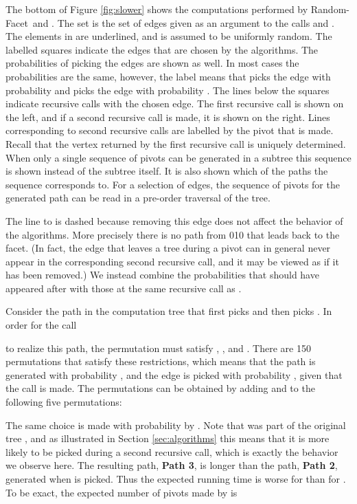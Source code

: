 \documentclass[twoside,11pt]{article}
\newcommand{\RandomFacet}{\mbox{\sc Random-}\allowbreak\mbox{\sc Facet}}
\begin{document}
The bottom of Figure \ref{fig:slower} shows the computations performed by \RandomFacet\ and . The set  is the set of edges given as an argument to the calls  and . The elements in  are underlined, and  is assumed to be uniformly random. The labelled squares indicate the edges that are chosen by the algorithms. The probabilities of picking the edges are shown as well. In most cases the probabilities are the same, however, the label  means that  picks the edge with probability  and  picks the edge with probability . The lines below the squares indicate recursive calls with the chosen edge. The first recursive call is shown on the left, and if a second recursive call is made, it is shown on the right. Lines corresponding to second recursive calls are labelled by the pivot that is made. Recall that the vertex returned by the first recursive call is uniquely determined. When only a single sequence of pivots can be generated in a subtree this sequence is shown instead of the subtree itself. It is also shown which of the paths the sequence corresponds to. For a selection of edges, the sequence of pivots for the generated path can be read in a pre-order traversal of the tree.

The line to  is dashed because removing this edge does not affect the behavior of the algorithms. More precisely there is no path from 010 that leads back to the  facet. (In fact, the edge that leaves a tree during a pivot can in general never appear in the corresponding second recursive call, and it may be viewed as if it has been removed.) We instead combine the probabilities that should have appeared after  with those at the same recursive call as .

Consider the path in the computation tree that first picks  and then picks .
In order for the call

to realize this path, the permutation  must satisfy , , and . There are 150 permutations that satisfy these restrictions, which means that the path is generated with probability , and the edge is picked with probability , given that the call is made. The permutations can be obtained by adding  and  to the following five permutations:

The same choice is made with probability  by . Note that  was part of the original tree , and as illustrated in Section \ref{sec:algorithms} this means that it is more likely to be picked during a second recursive call, which is exactly the behavior we observe here. The resulting path, \textbf{Path 3}, is longer than the path, \textbf{Path 2}, generated when  is picked. Thus the expected running time is worse for  than for . To be exact, the expected number of pivots made by  is
\end{document}
